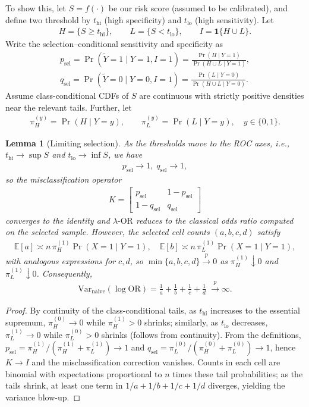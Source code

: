 \documentclass[pdflatex,sn-mathphys-num]{sn-jnl}%
\def\EQSP{3pt}
\newcommand{\cgather}[2][\EQSP]{\begingroup\setlength\abovedisplayskip{#1}\setlength\belowdisplayskip{#1}\begin{gather} #2 \end{gather}\endgroup\noindent}
\newtheorem{lem}{Lemma}
\newcommand{\SPOR}{\textrm{$\lambda$-OR}}
\theoremstyle{thmstyleone}%
\theoremstyle{thmstyletwo}%
\theoremstyle{thmstylethree}%
\begin{document}
To show this, let $S=f(\cdot)$ be our risk score (assumed to be  calibrated), and define two threshold by
$t_{\mathrm{hi}}$ (high specificity) and $t_{\mathrm{lo}}$ (high sensitivity). Let
\cgather{
H=\{S\ge t_{\mathrm{hi}}\},\qquad L=\{S<t_{\mathrm{lo}}\},\qquad I=\mathbf{1}\{H\cup L\}.
}
Write the selection–conditional sensitivity and specificity as
\cgather{
p_{\text{sel}}=\Pr(\tilde Y=1\mid Y=1,I=1)=\frac{\Pr(H\mid Y=1)}{\Pr(H\cup L\mid Y=1)},\\
q_{\text{sel}}=\Pr(\tilde Y=0\mid Y=0,I=1)=\frac{\Pr(L\mid Y=0)}{\Pr(H\cup L\mid Y=0)}.
}%
Assume class-conditional CDFs of $S$ are continuous with strictly positive densities near the relevant tails. Further, let
\cgather{
\pi_H^{(y)}=\Pr(H\mid Y=y),\qquad \pi_L^{(y)}=\Pr(L\mid Y=y),\quad y\in\{0,1\}.
}
%
\begin{lem}[Limiting selection]\label{lemsel}
As the thresholds move to the ROC axes, i.e., $t_{\mathrm{hi}} \to \sup S$ and $t_{\mathrm{lo}} \to \inf S$, we have
\cgather{
p_{\text{sel}}\to 1, \;  q_{\text{sel}}\to 1,
}
so the misclassification operator
\cgather{
K=\begin{bmatrix} p_{\text{sel}}&1-p_{\text{sel}}\\ 1-q_{\text{sel}}&q_{\text{sel}}\end{bmatrix}}
converges to the identity and $\SPOR$ reduces to the classical odds ratio computed on the selected sample.
However, the selected cell counts $(a,b,c,d)$ satisfy
\cgather{
\mathbb{E}[a]\asymp n\,\pi_H^{(1)}\Pr(X{=}1\mid Y{=}1),\quad
\mathbb{E}[b]\asymp n\,\pi_L^{(1)}\Pr(X{=}1\mid Y{=}1),
}
with analogous expressions for $c,d$, so $\min\{a,b,c,d\}\stackrel{p}{\to}0$ as $\pi_H^{(1)}\!\downarrow 0$ and $\pi_L^{(1)}\!\downarrow 0$. Consequently,
\cgather{
\mathrm{Var}_{\text{naive}}(\log\mathrm{OR})=\frac{1}{a}+\frac{1}{b}+\frac{1}{c}+\frac{1}{d}\;\xrightarrow{p}\infty.
}
\end{lem}
\begin{proof}
By continuity of the class-conditional tails, as $t_{\mathrm{hi}}$ increases to the essential supremum,
$\pi_H^{(0)}\to 0$ while $\pi_H^{(1)}>0$ shrinks; similarly, as $t_{\mathrm{lo}}$ decreases,
$\pi_L^{(1)}\to 0$ while $\pi_L^{(0)}>0$ shrinks (follows from continuity). From the definitions,
$p_{\text{sel}}=\pi_H^{(1)}/(\pi_H^{(1)}+\pi_L^{(1)})\to 1$ and
$q_{\text{sel}}=\pi_L^{(0)}/(\pi_H^{(0)}+\pi_L^{(0)})\to 1$, hence $K\to I$ and
the misclassification correction vanishes. Counts in each cell are binomial with expectations proportional
to $n$ times these tail probabilities; as the tails shrink, at least one term in $1/a+1/b+1/c+1/d$
diverges, yielding the variance blow-up. 
\end{proof}
%
\end{document}
